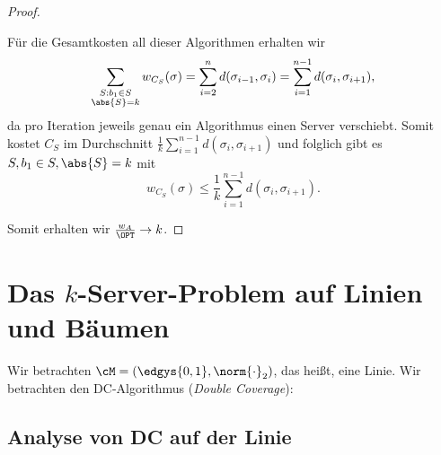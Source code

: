 \documentclass[language=ngerman,algolist]{TemplateLecture}
\begin{document}
\begin{proof}
\begin{description}
        Für die Gesamtkosten all dieser Algorithmen erhalten wir 
        \begin{equation*}
            \sum_{\substack{S: b_1 \in S \\ \abs{S} = k}} w_{C_S}(\sigma) =  \sum_{i = 2}^n d(\sigma_{i-1}, \sigma_i) = \sum_{i = 1}^{n-1} d(\sigma_i, \sigma_{i+1}),
        \end{equation*}
        da pro Iteration jeweils genau ein Algorithmus einen Server verschiebt. Somit kostet $C_S$ im Durchschnitt $\frac{1}{k} \sum_{i = 1}^{n-1} d(\sigma_i, \sigma_{i+1})$ und folglich gibt es $S, b_1 \in S, \abs{S} = k$ mit 
        \begin{equation*}
            w_{C_S}(\sigma) \leq \frac{1}{k}\sum_{i = 1}^{n-1} d(\sigma_i, \sigma_{i+1}).
        \end{equation*}
    \end{description}
    Somit erhalten wir $\frac{w_A}{\OPT} \to k$.
\end{proof}

\section{Das $k$-Server-Problem auf Linien und Bäumen}

Wir betrachten $\cM = (\edgys{0,1}, \norm{\cdot}_2)$, das heißt, eine Linie. Wir betrachten den DC-Algorithmus (\emph{Double Coverage}):

\begin{algorithm}[h]
    \caption{DC}\label{alg:DC}
    \begin{algorithmic}[1]
                \Else{}
            \EndIf{}
        \EndFor{}
    \end{algorithmic}
\end{algorithm}

\subsection{Analyse von DC auf der Linie}
\end{document}
